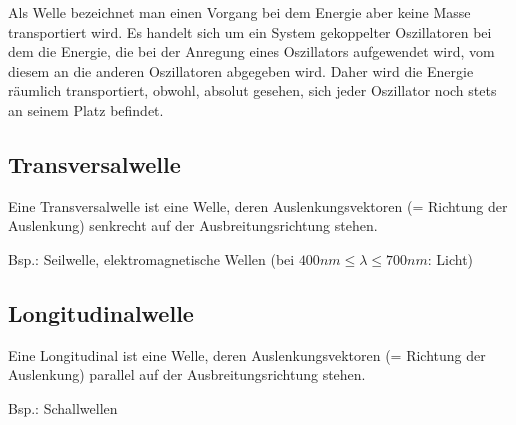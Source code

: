 Als Welle bezeichnet man einen Vorgang bei dem Energie aber keine Masse transportiert wird. Es handelt sich um ein System gekoppelter Oszillatoren bei dem die Energie, die bei der Anregung eines Oszillators aufgewendet wird, vom diesem an die anderen Oszillatoren abgegeben wird. Daher wird die Energie räumlich transportiert, obwohl, absolut gesehen, sich jeder Oszillator noch stets an seinem Platz befindet.

\subsection{Transversalwelle}

Eine Transversalwelle ist eine Welle, deren Auslenkungsvektoren (= Richtung der Auslenkung) senkrecht auf der Ausbreitungsrichtung stehen.

Bsp.: Seilwelle, elektromagnetische Wellen (bei $ 400nm \leq \lambda \leq 700nm $: Licht)

\subsection{Longitudinalwelle}

Eine Longitudinal ist eine Welle, deren Auslenkungsvektoren (= Richtung der Auslenkung) parallel auf der Ausbreitungsrichtung stehen.

Bsp.: Schallwellen